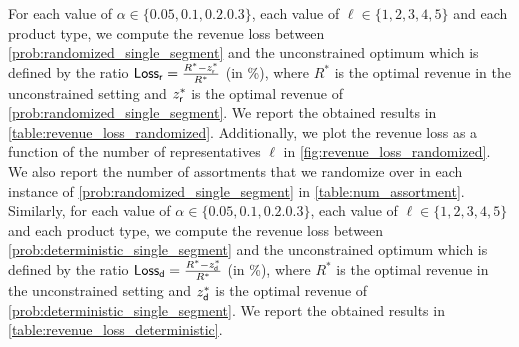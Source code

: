 \documentclass[msom,non-blindrev]{informs3} %
\theoremstyle{definition}
\begin{document}
For each value of $\alpha \in \{0.05,0.1, 0.2. 0.3\}$, each value of  $ \ell \in \{1,2,3,4,5\}$ and each product type, we compute  the revenue loss  between  \eqref{prob:randomized_single_segment} and the unconstrained optimum  which is defined by the ratio  ${\sf Loss_r}= \frac{R^* - z^*_{\sf r}}{R^*} $ (in \%), where $R^*$ is the optimal revenue in the unconstrained setting and $z^*_{\sf r}$ is the optimal revenue of \eqref{prob:randomized_single_segment}. We report the obtained results in \cref{table:revenue_loss_randomized}. Additionally, we plot the revenue loss as a function of the number of representatives $\ell$  in \cref{fig:revenue_loss_randomized}. We also report the number of assortments that we randomize over in each instance of  \eqref{prob:randomized_single_segment} in  \cref{table:num_assortment}. Similarly, for each value of $\alpha \in \{0.05,0.1, 0.2. 0.3\}$, each value of  $ \ell \in \{1,2,3,4,5\}$ and each product type, we compute  the revenue loss  between  \eqref{prob:deterministic_single_segment} and the unconstrained optimum  which is defined by the ratio  ${\sf Loss_d}= \frac{R^* - z^*_{\sf d}}{R^*} $ (in \%), where $R^*$ is the optimal revenue in the unconstrained setting and $z^*_{\sf d}$ is the optimal revenue of \eqref{prob:deterministic_single_segment}. We report the obtained results in \cref{table:revenue_loss_deterministic}.







\end{document}
